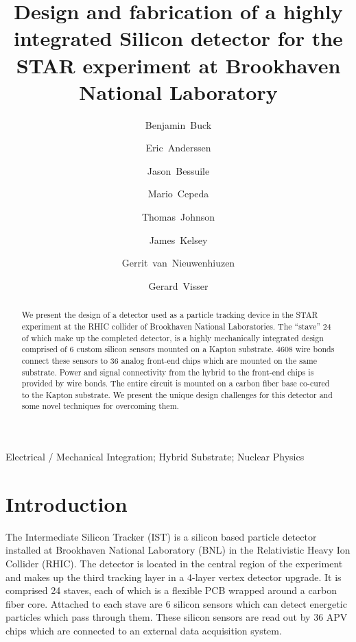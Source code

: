 \documentclass[preprint,12pt]{elsarticle}
\begin{document}
\begin{frontmatter}
\title{Design and fabrication of a highly integrated Silicon detector for the
STAR experiment at Brookhaven National Laboratory}
%
\author[mit]{Benjamin~Buck}
\author[lbl]{Eric~Anderssen}
\author[mit]{Jason~Bessuile}
\author[lbl]{Mario~Cepeda}
\author[lbl]{Thomas~Johnson}
\author[mit]{James~Kelsey}
\author[mit]{Gerrit~van~Nieuwenhiuzen}
\author[iu]{Gerard~Visser}
\address[iu]{Indiana University, Bloomington, IN, USA}
\address[lbl]{Lawrence Berkeley National Laboratory, Berkeley, CA, USA}
\address[mit]{Massachusetts Institute of Technology, Cambring, MA, USA}
%
%
\begin{abstract}
We present the design of a detector used as a particle tracking device in the
STAR experiment at the RHIC collider of Brookhaven National Laboratories. The
``stave'' 24 of which make up the completed detector, is a highly mechanically
integrated design comprised of 6 custom silicon sensors mounted on a Kapton
substrate. 4608 wire bonds connect these sensors to 36 analog front-end chips
which are mounted on the same substrate. Power and signal connectivity from the
hybrid to the front-end chips is provided by wire bonds. The entire circuit is
mounted on a carbon fiber base co-cured to the Kapton substrate. We present the
unique design challenges for this detector and some novel techniques for
overcoming them.
\end{abstract}
\begin{keyword}
Electrical / Mechanical Integration; Hybrid Substrate; Nuclear Physics
\end{keyword}
\end{frontmatter}
%
\section{Introduction}
The Intermediate Silicon Tracker (IST) is a silicon based particle detector
installed at Brookhaven National Laboratory (BNL) in the Relativistic Heavy Ion
Collider (RHIC). The detector is located in the central region of the experiment
and makes up the third tracking layer in a 4-layer vertex detector
upgrade. It is comprised 24 staves, each of which is a flexible PCB wrapped
around a carbon fiber core. Attached to each stave are 6 silicon sensors which
can detect energetic particles which pass through them. These silicon sensors are read
out by 36 APV chips which are connected to an external data acquisition system.
\end{document}
